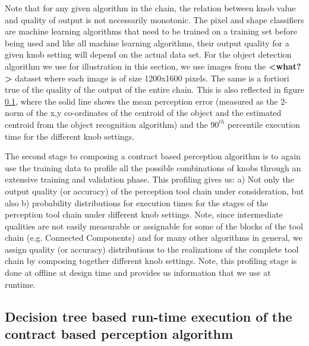 Note that for any given algorithm in the chain, the relation between knob value and quality of output is not necessarily monotonic. The pixel and shape classifiers are machine learning algorithms that need to be trained on a training set before being used and like all machine learning algorithms, their output quality for a given knob setting will depend on the actual data set. For the object detection algorithm we use for illustration in this section, we use images from the \textbf{<what?>} dataset where each image is of size 1200x1600 pixels. The same is a fortiori true of the quality of the output of the entire chain. This is also reflected in figure \ref{}, where the solid line shows the mean perception error (measured as the 2-norm of the x,y co-ordinates of the centroid of the object and the estimated centroid from the object recognition algorithm) and the $90^{th}$ percentile execution time for the different knob settings.

The second stage to composing a contract based perception algorithm is to again use the training data to profile all the possible combinations of knobs through an extensive training and validation phase. This profiling gives us: a) Not only the output quality (or accuracy) of the perception tool chain under consideration, but also b) probability distributions for execution times for the stages of the perception tool chain under different knob settings. Note, since intermediate qualities are not easily measurable or assignable for some of the blocks of the tool chain (e.g. Connected Components) and for many other algorithms in general, we assign quality (or accuracy) distributions to the realizations of the complete tool chain by composing together different knob settings. Note, this profiling stage is done at offline at design time and provides us information that we use at runtime.

\subsection{Decision tree based run-time execution of the contract based perception algorithm}

